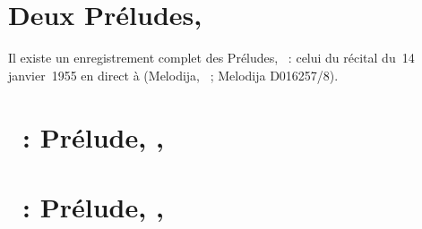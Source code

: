 \section*{%
Deux Préludes, }

Il existe un enregistrement complet des Préludes, ~: celui du
récital du~14 janvier~1955 en direct à \MCGH (Melodija, ~; Melodija
D016257/8).

\section{\ifChrono \Scriabine{}~: \fi
Prélude,  , }
\label{\thesection}

\begin{workitemize}
 \item{}
 \begin{perfitemize}
  \item{}
  \item{}
 \end{perfitemize}
 \item{}
 \begin{perfitemize}
  \item\NoEdition{}
 \end{perfitemize}
 \item{}
 \begin{perfitemize}
  \item{}
 \end{perfitemize}
\end{workitemize}

\section{\ifChrono \Scriabine{}~: \fi
Prélude,  , }
\label{\thesection}

\begin{workitemize}
 \item{}
 \begin{perfitemize}
  \item{}
  \item{}
 \end{perfitemize}
 \item{}
 \begin{perfitemize}
  \item\NoEdition{}
 \end{perfitemize}
\end{workitemize}

